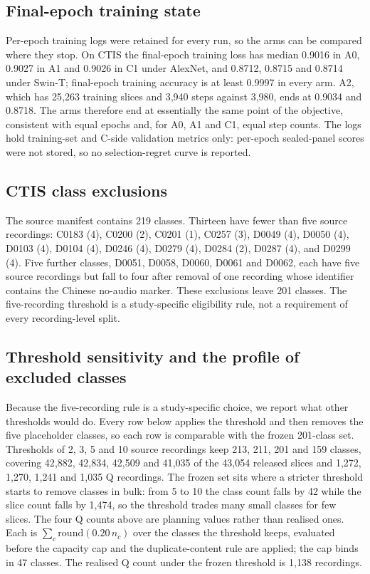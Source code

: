 \subsection{Final-epoch training state}

Per-epoch training logs were retained for every run, so the arms can be compared where they
stop. On CTIS the final-epoch training loss has median 0.9016 in A0, 0.9027 in A1 and 0.9026 in
C1 under AlexNet, and 0.8712, 0.8715 and 0.8714 under Swin-T; final-epoch training accuracy is at
least 0.9997 in every arm. A2, which has 25{,}263 training slices and 3{,}940 steps against
3{,}980, ends at 0.9034 and 0.8718. The arms therefore end at essentially the same point of the objective,
consistent with equal epochs and, for A0, A1 and C1, equal step counts. The logs hold
training-set and C-side validation metrics only: per-epoch sealed-panel scores were not stored,
so no selection-regret curve is reported.

\subsection{CTIS class exclusions}

The source manifest contains 219 classes. Thirteen have fewer than five source recordings:
C0183 (4), C0200 (2), C0201 (1), C0257 (3), D0049 (4), D0050 (4), D0103 (4),
D0104 (4), D0246 (4), D0279 (4), D0284 (2), D0287 (4), and D0299 (4).
Five further classes, D0051, D0058, D0060, D0061 and D0062, each have five source
recordings but fall to four after removal of one recording whose identifier contains the
Chinese no-audio marker. These exclusions leave 201 classes. The five-recording threshold
is a study-specific eligibility rule, not a requirement of every recording-level split.

\subsection{Threshold sensitivity and the profile of excluded classes}

Because the five-recording rule is a study-specific choice, we report what other thresholds
would do. Every row below applies the threshold and then removes the five placeholder classes,
so each row is comparable with the frozen 201-class set. Thresholds of 2, 3, 5 and 10 source
recordings keep 213, 211, 201 and 159 classes, covering 42{,}882, 42{,}834, 42{,}509 and
41{,}035 of the 43{,}054 released slices and 1{,}272, 1{,}270, 1{,}241 and 1{,}035 Q
recordings. The frozen set sits where a stricter threshold starts to remove classes in bulk:
from 5 to 10 the class count falls by 42 while the slice count falls by 1{,}474, so the
threshold trades many small classes for few slices. The four Q counts above are planning values
rather than realised ones. Each is $\sum_c \mathrm{round}(0.20\,n_c)$ over the classes the
threshold keeps, evaluated before the capacity cap and the duplicate-content rule are applied; the
cap binds in 47 classes. The realised Q count under the frozen threshold is 1{,}138 recordings.

